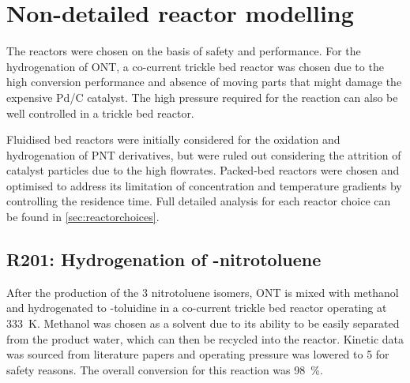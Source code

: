 \section{Non-detailed reactor modelling} \label{Non-detailed}

The reactors were chosen on the basis of safety and performance. For the hydrogenation of ONT, a co-current trickle bed reactor was chosen due to the high conversion performance and absence of moving parts that might damage the expensive Pd/C catalyst. The high pressure required for the reaction can also be well controlled in a trickle bed reactor. 

Fluidised bed reactors were initially considered for the oxidation and hydrogenation of PNT derivatives, but were ruled out considering the attrition of catalyst particles due to the high flowrates. Packed-bed reactors were chosen and optimised to address its limitation of concentration and temperature gradients by controlling the residence time. Full detailed analysis for each reactor choice can be found in \cref{sec:reactorchoices}.

\begin{table}[h]
\centering
\caption{Summary of non-detailed reactors}
\label{tab:nondetailedtable}
\end{table}

\subsection{R201: Hydrogenation of \ortho-nitrotoluene}
After the production of the 3 nitrotoluene isomers, ONT is mixed with methanol and hydrogenated to \ortho-toluidine in a co-current trickle bed reactor operating at \SI{333}{\K}. Methanol was chosen as a solvent due to its ability to be easily separated from the product water, which can then be recycled into the reactor. Kinetic data was sourced from literature papers \cite{rajadhyaksha_solvent_1986} and operating pressure was lowered to \SI{5}{\atm} for safety reasons. The overall conversion for this reaction was \SI{98}{\%}.


